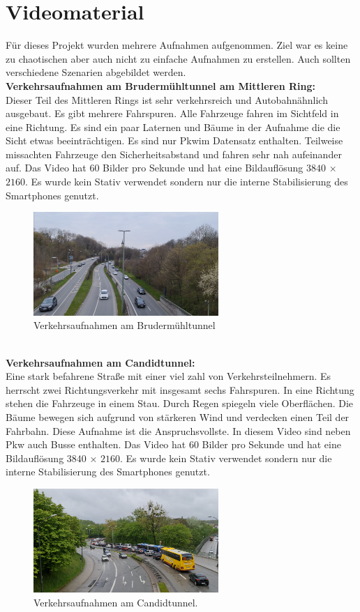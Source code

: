 \documentclass[conference]{IEEEtran}
\begin{document}
	\section{Videomaterial}
	Für dieses Projekt wurden mehrere Aufnahmen aufgenommen. Ziel war es keine zu chaotischen aber auch nicht zu einfache Aufnahmen zu erstellen. Auch sollten verschiedene Szenarien abgebildet werden.\\
	\textbf{Verkehrsaufnahmen am Brudermühltunnel am Mittleren Ring:}\\
	Dieser Teil des Mittleren Rings ist sehr verkehrsreich und Autobahnähnlich ausgebaut. Es gibt mehrere Fahrspuren. Alle Fahrzeuge fahren im Sichtfeld in eine Richtung. Es sind ein paar Laternen und Bäume in der Aufnahme die die Sicht etwas beeinträchtigen. Es sind nur Pkwim Datensatz enthalten. Teilweise missachten Fahrzeuge den Sicherheitsabstand und fahren sehr nah aufeinander auf. Das Video hat 60 Bilder pro Sekunde und hat eine Bildauflösung $3840$ × $2160$. Es wurde kein Stativ verwendet sondern nur die interne Stabilisierung des Smartphones genutzt.
	\begin{figure}[!h]
		\begin{center}
			\includegraphics[width=7cm]{Media/BrudermuhlRaw.png}
			\caption{Verkehrsaufnahmen am Brudermühltunnel}
			\label{BrudermuhlRaw}
		\end{center}
	\end{figure}\\
	\textbf{Verkehrsaufnahmen am Candidtunnel:}\\
	Eine stark befahrene Straße mit einer viel zahl von Verkehrsteilnehmern. Es herrscht zwei Richtungsverkehr mit insgesamt sechs Fahrspuren. In eine Richtung stehen die Fahrzeuge in einem Stau. Durch Regen spiegeln viele Oberflächen. Die Bäume bewegen sich aufgrund von stärkeren Wind und verdecken einen Teil der Fahrbahn. Diese Aufnahme ist die Anspruchsvollste. In diesem Video sind neben Pkw auch Busse enthalten. Das Video hat 60 Bilder pro Sekunde und hat eine Bildauflösung $3840$ × $2160$. Es wurde kein Stativ verwendet sondern nur die interne Stabilisierung des Smartphones genutzt.
	\begin{figure}[!h]
		\begin{center}
			\includegraphics[width=7cm]{Media/CandidRaw.png}
			\caption{Verkehrsaufnahmen am Candidtunnel.}
			\label{BrudermuhlRaw}
		\end{center}
	\end{figure}\\
\end{document}
